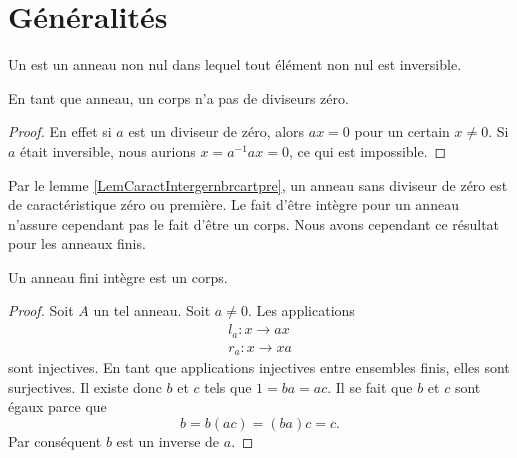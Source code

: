 
\section{Généralités}

\begin{definition}
    Un  est un anneau non nul dans lequel tout élément non nul est inversible.
\end{definition}

\begin{lemma}       \label{LemAnnCorpsnonInterdivzer}
    En tant que anneau, un corps n'a pas de diviseurs zéro.
\end{lemma}

\begin{proof}
    En effet si \( a\) est un diviseur de zéro, alors \( ax=0\) pour un certain \( x\neq 0\). Si \( a\) était inversible, nous aurions \( x=a^{-1}ax=0\), ce qui est impossible.
\end{proof}

Par le lemme \ref{LemCaractIntergernbrcartpre}, un anneau sans diviseur de zéro est de caractéristique zéro ou première. Le fait d'être intègre pour un anneau n'assure cependant pas le fait d'être un corps. Nous avons cependant ce résultat pour les anneaux finis.

\begin{proposition}     \label{PropanfinintimpCorp}
    Un anneau fini intègre est un corps.
\end{proposition}

\begin{proof}
    Soit \( A\) un tel anneau. Soit \( a\neq 0\). Les applications 
    \begin{subequations}
        \begin{align}
            l_a\colon x\to ax\\
            r_a\colon x\to xa
        \end{align}
    \end{subequations}
    sont injectives. En tant que applications injectives entre ensembles finis, elles sont surjectives. Il existe donc \( b\) et \( c\) tels que \( 1=ba=ac\). Il se fait que \( b\) et \( c\) sont égaux parce que
    \begin{equation}
        b=b(ac)=(ba)c=c.
    \end{equation}
    Par conséquent \( b\) est un inverse de \( a\).
\end{proof}


